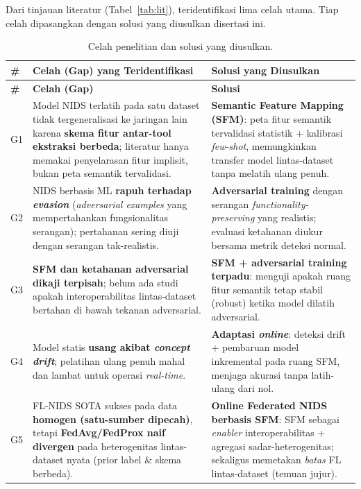 \documentclass[11pt,a4paper]{article}
\begin{document}
Dari tinjauan literatur (Tabel~\ref{tab:lit}), teridentifikasi lima celah utama.
Tiap celah dipasangkan dengan solusi yang diusulkan disertasi ini.

\renewcommand{\arraystretch}{1.3}
\begin{longtable}{@{}>{\RaggedRight\arraybackslash}p{0.6cm}
                     >{\RaggedRight\arraybackslash}p{6.0cm}
                     >{\RaggedRight\arraybackslash}p{7.0cm}@{}}
\caption{Celah penelitian dan solusi yang diusulkan.}\label{tab:gap}\\
\toprule
\textbf{\#} & \textbf{Celah (Gap) yang Teridentifikasi} & \textbf{Solusi yang Diusulkan} \\
\midrule
\endfirsthead
\toprule
\textbf{\#} & \textbf{Celah (Gap)} & \textbf{Solusi} \\
\midrule
\endhead
\bottomrule
\endlastfoot

G1 & Model NIDS terlatih pada satu dataset tidak tergeneralisasi
ke jaringan lain karena \textbf{skema fitur antar-tool ekstraksi berbeda};
literatur hanya memakai penyelarasan fitur implisit, bukan peta semantik
tervalidasi. &
\textbf{Semantic Feature Mapping (SFM)}: peta fitur semantik tervalidasi
statistik + kalibrasi \emph{few-shot}, memungkinkan transfer model
lintas-dataset tanpa melatih ulang penuh. \\

G2 & NIDS berbasis ML \textbf{rapuh terhadap \emph{evasion}}
(\emph{adversarial examples} yang mempertahankan fungsionalitas serangan);
pertahanan sering diuji dengan serangan tak-realistis. &
\textbf{Adversarial training} dengan serangan \emph{functionality-preserving}
yang realistis; evaluasi ketahanan diukur bersama metrik deteksi normal. \\

G3 & \textbf{SFM dan ketahanan adversarial dikaji terpisah};
belum ada studi apakah interoperabilitas lintas-dataset bertahan di bawah
tekanan adversarial. &
\textbf{SFM + adversarial training terpadu}: menguji apakah ruang fitur
semantik tetap stabil (robust) ketika model dilatih adversarial. \\

G4 & Model statis \textbf{usang akibat \emph{concept drift}};
pelatihan ulang penuh mahal dan lambat untuk operasi \emph{real-time}. &
\textbf{Adaptasi \emph{online}}: deteksi drift + pembaruan model inkremental
pada ruang SFM, menjaga akurasi tanpa latih-ulang dari nol. \\

G5 & FL-NIDS SOTA sukses pada data \textbf{homogen (satu-sumber dipecah)},
tetapi \textbf{FedAvg/FedProx naif divergen} pada heterogenitas lintas-dataset
nyata (prior label \& skema berbeda). &
\textbf{Online Federated NIDS berbasis SFM}: SFM sebagai \emph{enabler}
interoperabilitas + agregasi sadar-heterogenitas; sekaligus memetakan
\emph{batas} FL lintas-dataset (temuan jujur). \\

\end{longtable}
\end{document}
